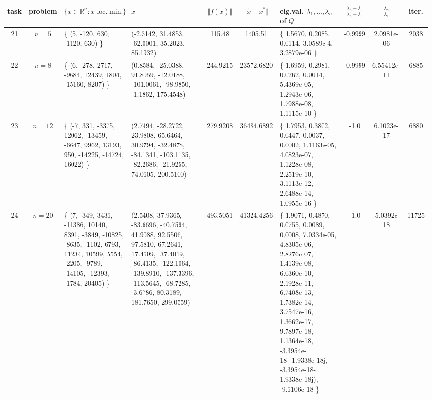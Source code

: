 \documentclass[12pt, a4paper, parskip=half]{scrartcl}
\begin{document}
\begin{enumerate}[leftmargin=0.5cm, label=(\roman*)]
        \begin{table}[!ht]
            \tiny
            \begin{adjustbox}{angle=90}
                \begin{tabular}{|| c | c | p{3cm} | p{3cm} | c | c | p{3cm} | c | c | c ||} 
                    \hline
                    task & problem & $\{ x \in \mathbb{R}^n : x \text{ loc. min.}\}$ & $\tilde{x}$ & $\Vert f(\tilde{x}) \Vert$ & $\Vert \tilde{x} - x^* \Vert$ & eig.val. $\lambda_1, \dots, \lambda_n$ of $Q$ & $\frac{\lambda_n - \lambda_1}{\lambda_n + \lambda_1}$ & $\frac{\lambda_n}{\lambda_1}$ & iter. \\ [0.5ex] 
                    \hline\hline
                    21 & $n=5$ & \{ (5, -120, 630, -1120, 630) \} & (-2.3142, 31.4853, -62.0001,-35.2023, 85.1932) & 115.48 & 1405.51 & \{ 1.5670, 0.2085, 0.0114, 3.0589e-4, 3.2879e-06 \} & -0.9999 & 2.0981e-06 & 2038 \\
                    \hline
                    22 & $n=8$ & \{ (6, -278, 2717, -9684, 12439, 1804, -15160, 8207) \} & (0.8584, -25.0388, 91.8059, -12.0188, -101.0061, -98.9850, -1.1862, 175.4548) & 244.9215 & 23572.6820 & \{ 1.6959, 0.2981, 0.0262, 0.0014, 5.4369e-05, 1.2943e-06, 1.7988e-08, 1.1115e-10 \} & -0.9999 & 6.55412e-11 & 6885 \\
                    \hline
                    23 & $n=12$ & \{ (-7, 331, -3375, 12062, -13459, -6647, 9962, 13193, 950, -14225, -14724, 16022) \} & (2.7494, -28.2722, 23.9808, 65.6464, 30.9794, -32.4878, -84.1341, -103.1135, -82.2686, -21.9255, 74.0605, 200.5100) & 279.9208 & 36484.6892 & \{ 1.7953, 0.3802, 0.0447, 0.0037, 0.0002, 1.1163e-05, 4.0823e-07, 1.1228e-08, 2.2519e-10, 3.1113e-12, 2.6488e-14, 1.0955e-16 \} & -1.0 & 6.1023e-17 & 6880 \\
                    \hline
                    24 & $n=20$ & \{ (7, -349, 3436, -11386, 10140, 8391, -3849, -10825, -8635, -1102, 6793, 11234, 10599, 5554, -2205, -9789, -14105, -12393, -1784, 20405) \} & (2.5408, 37.9365, -83.6696, -40.7594, 41.9088, 92.5506, 97.5810, 67.2641, 17.4699, -37.4019, -86.4135, -122.1064, -139.8910, -137.3396, -113.5645, -68.7285, -3.6786, 80.3189, 181.7650, 299.0559) & 493.5051 & 41324.4256 & \{ 1.9071, 0.4870, 0.0755, 0.0089, 0.0008, 7.0334e-05, 4.8305e-06, 2.8276e-07, 1.4139e-08, 6.0360e-10, 2.1928e-11, 6.7408e-13, 1.7382e-14, 3.7547e-16, 1.3662e-17, 9.7897e-18, 1.1364e-18, -3.3954e-18+1.9338e-18j, -3.3954e-18-1.9338e-18j), -9.6106e-18 \} & -1.0 & -5.0392e-18 & 11725 \\
                    \hline

\end{tabular}
\end{adjustbox}
\end{table}
\end{enumerate}
\end{document}
